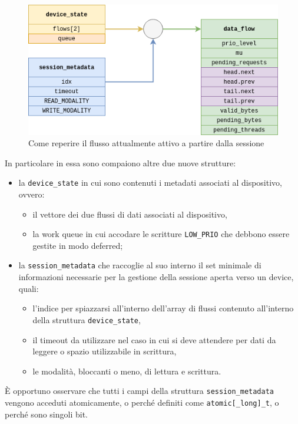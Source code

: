 \documentclass{article}
\begin{document}
\begin{figure}[htbp]
        \centering
        \includegraphics[width=.8\textwidth]{get_active_flow}
        \caption{Come reperire il flusso attualmente attivo a partire dalla sessione}
        \label{fig:get_active_flow}
\end{figure}

In particolare in essa sono compaiono altre due nuove strutture:
\begin{itemize}
        \item la \texttt{device\_state} in cui sono contenuti i metadati associati al dispositivo, ovvero:
                \begin{itemize}
                        \item il vettore dei due flussi di dati associati al dispositivo,
                        \item la work queue in cui accodare le scritture \texttt{LOW\_PRIO} che debbono essere gestite in modo deferred;
                \end{itemize}
        \item la \texttt{session\_metadata} che raccoglie al suo interno il set minimale di informazioni necessarie per la gestione della sessione aperta verso un device, quali:
                \begin{itemize}
                        \item l'indice per spiazzarsi all'interno dell'array di flussi contenuto all'interno della struttura \texttt{device\_state},
                        \item il timeout da utilizzare nel caso in cui si deve attendere per dati da leggere o spazio utilizzabile in scrittura,
                        \item le modalità, bloccanti o meno, di lettura e scrittura.
                \end{itemize}
\end{itemize}

È opportuno osservare che tutti i campi della struttura \texttt{session\_metadata} vengono acceduti atomicamente, o perché definiti come \texttt{atomic[\_long]\_t}, o perché sono singoli bit.
\end{document}
